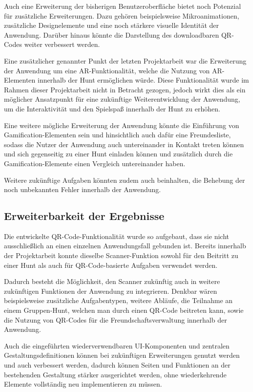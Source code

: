 ﻿\documentclass[oneside]{ausarbeitung}
\begin{document}
Auch eine Erweiterung der bisherigen Benutzeroberfläche bietet noch Potenzial für zusätzliche Erweiterungen. Dazu gehören beispielsweise
Mikroanimationen, zusätzliche Designelemente und eine noch stärkere visuelle Identität der Anwendung. Darüber hinaus könnte die Darstellung
des downloadbaren QR-Codes weiter verbessert werden.

Eine zusätzlicher genannter Punkt der letzten Projektarbeit war die Erweiterung der Anwendung um eine AR-Funktionalität, welche die Nutzung
von AR-Elementen innerhalb der Hunt ermöglichen würde. Diese Funktionalität wurde im Rahmen dieser Projektarbeit nicht in Betracht gezogen, jedoch
wirkt dies als ein möglicher Ansatzpunkt für eine zukünftige Weiterentwicklung der Anwendung, um die Interaktivität und den Spielspaß innerhalb der
Hunt zu erhöhen.

Eine weitere mögliche Erweiterung der Anwendung könnte die Einführung von Gamification-Elementen sein und hinsichtlich auch dafür eine Freundesliste,
sodass die Nutzer der Anwendung auch untereinander in Kontakt treten können und sich gegenseitig zu einer Hunt einladen können und zusätzlich durch die 
Gamification-Elemente einen Vergleich untereinander haben.

Weitere zukünftige Aufgaben könnten zudem auch beinhalten, die Behebung der noch unbekannten Fehler innerhalb der Anwendung.


\subsection{Erweiterbarkeit der Ergebnisse}
\label{sub:erweiterbarkeit}

Die entwickelte QR-Code-Funktionalität wurde so aufgebaut, dass sie nicht ausschließlich an einen einzelnen Anwendungsfall gebunden ist. 
Bereits innerhalb der Projektarbeit konnte dieselbe Scanner-Funktion sowohl für den Beitritt zu einer Hunt als auch für QR-Code-basierte Aufgaben 
verwendet werden.

Dadurch besteht die Möglichkeit, den Scanner zukünftig auch in weitere zukünftigen Funktionen der Anwendung zu integrieren. Denkbar wären beispielsweise 
zusätzliche Aufgabentypen, weitere Abläufe, die Teilnahme an einem Gruppen-Hunt, welchen man durch einen QR-Code beitreten kann, sowie die Nutzung von 
QR-Codes für die Freundschaftsverwaltung innerhalb der Anwendung.

Auch die eingeführten wiederverwendbaren UI-Komponenten und zentralen Gestaltungsdefinitionen können bei zukünftigen Erweiterungen genutzt werden und 
auch verbessert werden, dadurch können Seiten und Funktionen an der bestehenden Gestaltung stärker ausgerichtet werden, ohne wiederkehrende Elemente 
vollständig neu implementieren zu müssen.
\end{document}

